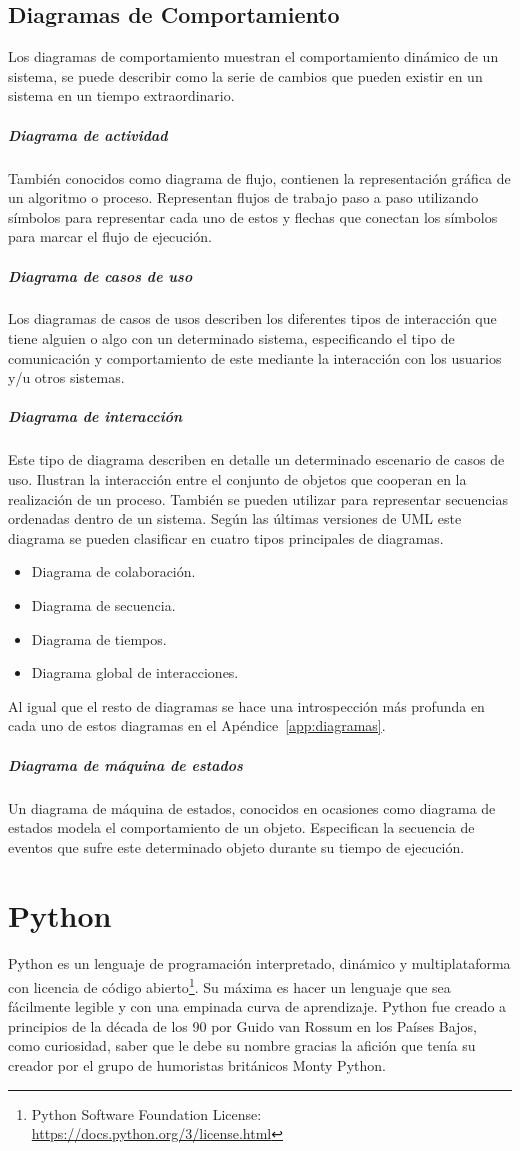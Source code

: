 \documentclass[a4paper, 12pt]{book}
\begin{document}
\subsection{Diagramas de Comportamiento}
Los diagramas de comportamiento muestran el comportamiento dinámico de un sistema, se puede describir como la serie de cambios que pueden existir en un sistema en un tiempo extraordinario.  
\subparagraph{Diagrama de actividad}
También conocidos como diagrama de flujo, contienen la representación gráfica de un algoritmo o proceso. Representan flujos de trabajo paso a paso utilizando símbolos para representar cada uno de estos y flechas que conectan los símbolos para marcar el flujo de ejecución. 
\subparagraph{Diagrama de casos de uso}
Los diagramas de casos de usos describen los diferentes tipos de interacción que tiene alguien o algo con un determinado sistema, especificando el tipo de comunicación y comportamiento de este mediante la interacción con los usuarios y/u otros sistemas.
\subparagraph{Diagrama de interacción}
Este tipo de diagrama describen en detalle un determinado escenario de casos de uso. Ilustran la interacción entre el conjunto de objetos que cooperan en la realización de un proceso. También se pueden utilizar para representar secuencias ordenadas dentro de un sistema. Según las últimas versiones de UML este diagrama se pueden clasificar en cuatro tipos principales de diagramas. 
\begin{itemize}
	\item Diagrama de colaboración. 
	\item Diagrama de secuencia. 
	\item Diagrama de tiempos. 
	\item Diagrama global de interacciones.  
\end{itemize}
Al igual que el resto de diagramas se hace una introspección más profunda en cada uno de estos diagramas en el Apéndice~\ref{app:diagramas}.
\subparagraph{Diagrama de máquina de estados}
Un diagrama de máquina de estados, conocidos en ocasiones como diagrama de estados modela el comportamiento de un objeto. Especifican la secuencia de eventos que sufre este determinado objeto durante su tiempo de ejecución. 

\section{Python}
\label{sec:python}
Python es un lenguaje de programación interpretado, dinámico y multiplataforma con licencia de código abierto\footnote{Python Software Foundation License: \url{https://docs.python.org/3/license.html}}. Su máxima es hacer un lenguaje que sea fácilmente legible y con una empinada curva de aprendizaje. Python fue creado a principios de la década de los 90 por Guido van Rossum en los Países Bajos, como curiosidad, saber que le debe su nombre gracias la afición que tenía su creador por el grupo de humoristas británicos Monty Python. 
\end{document}
